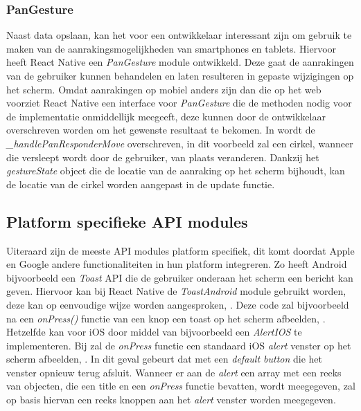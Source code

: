 	
	\subsubsection{PanGesture}
Naast data opslaan, kan het voor een ontwikkelaar interessant zijn om gebruik te maken van de aanrakingsmogelijkheden van smartphones en tablets. Hiervoor heeft React Native een \emph{PanGesture} module ontwikkeld. Deze gaat de aanrakingen van de gebruiker kunnen behandelen en laten resulteren in gepaste wijzigingen op het scherm. Omdat aanrakingen op mobiel anders zijn dan die op het web voorziet React Native een interface voor \emph{PanGesture} die de methoden nodig voor de implementatie onmiddellijk meegeeft, deze kunnen door de ontwikkelaar overschreven worden om het gewenste resultaat te bekomen. In  wordt de \emph{\_handlePanResponderMove} overschreven, in dit voorbeeld zal een cirkel, wanneer die versleept wordt door de gebruiker, van plaats veranderen. Dankzij het \emph{gestureState} object die de locatie van de aanraking op het scherm bijhoudt, kan de locatie van de cirkel worden aangepast in de update functie.


\subsection{Platform specifieke API modules}
Uiteraard zijn de meeste API modules platform specifiek, dit komt doordat Apple en Google andere functionaliteiten in hun platform integreren. Zo heeft Android bijvoorbeeld een \emph{Toast} API die de gebruiker onderaan het scherm een bericht kan geven. Hiervoor kan bij React Native de \emph{ToastAndroid} module gebruikt worden, deze kan op eenvoudige wijze worden aangesproken, . Deze code zal bijvoorbeeld na een \emph{onPress()} functie van een knop een toast op het scherm afbeelden, . Hetzelfde kan voor iOS door middel van bijvoorbeeld een \emph{AlertIOS} te implementeren. Bij  zal de \emph{onPress} functie een standaard iOS \emph{alert} venster op het scherm afbeelden, . In dit geval gebeurt dat met een \emph{default button} die het venster opnieuw terug afsluit. Wanneer er aan de \emph{alert} een array met een reeks van objecten, die een title en een \emph{onPress} functie bevatten, wordt meegegeven, zal op basis hiervan een reeks knoppen aan het \emph{alert} venster worden meegegeven.   

